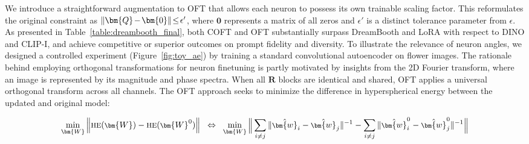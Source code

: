 {We introduce a straightforward augmentation to OFT that allows each neuron to possess its own trainable scaling factor. This reformulates the original constraint as $\thickmuskip=2mu \medmuskip=2mu \|\bm{Q}-\bm{0}\|\leq\epsilon'$, where $\bm{0}$ represents a matrix of all zeros and $\epsilon'$ is a distinct tolerance parameter from $\epsilon$. As presented in Table~\ref{table:dreambooth_final}, both COFT and OFT substantially surpass DreamBooth and LoRA with respect to DINO and CLIP-I, and achieve competitive or superior outcomes on prompt fidelity and diversity. To illustrate the relevance of neuron angles, we designed a controlled experiment (Figure~\ref{fig:toy_ae}) by training a standard convolutional autoencoder on flower images. The rationale behind employing orthogonal transformations for neuron finetuning is partly motivated by insights from the 2D Fourier transform, where an image is represented by its magnitude and phase spectra. When all $\bm{R}$ blocks are identical and shared, OFT applies a universal orthogonal transform across all channels. The OFT approach seeks to minimize the difference in hyperspherical energy between the updated and original model:

\begin{equation}\label{eq:oft_principle}
\footnotesize
\min_{\bm{W}} \left\| \text{HE}(\bm{W})-\text{HE}(\bm{W}^0)\right\|~~\Leftrightarrow~~\min_{\bm{W}} \bigg{\|} \sum_{i\neq j} \|\hat{\bm{w}}_i-\hat{\bm{w}}_j\|^{-1}-\sum_{i\neq j} \|\hat{\bm{w}}^0_i-\hat{\bm{w}}^0_j\|^{-1}\bigg{\|}
\end{equation}

}
